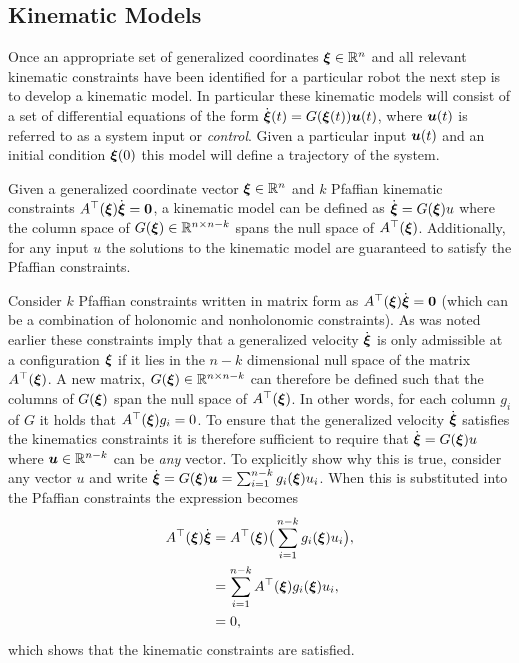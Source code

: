 \subsection{Kinematic Models}
Once an appropriate set of generalized coordinates $\bm{\xi} \in \mathbb{R}^n$ and all relevant kinematic constraints have been identified for a particular robot the next step is to develop a kinematic model.
In particular these kinematic models will consist of a set of differential equations of the form $\dot{\bm{\xi}}(t) = G(\bm{\xi}(t))\bm{u}(t)$, where $\bm{u}(t)$ is referred to as a system input or \textit{control}. Given a particular input $\bm{u}(t)$ and an initial condition $\bm{\xi}(0)$ this model will define a trajectory of the system.

\begin{definition} 
Given a generalized coordinate vector $\bm{\xi} \in \mathbb{R}^n$ and $k$ Pfaffian kinematic constraints $A^\top (\bm{\xi})\dot{\bm{\xi}}=\bm{0}$, a kinematic model can be defined as $\dot{\bm{\xi}} = G(\bm{\xi})u$ where the column space of $G(\bm{\xi}) \in \mathbb{R}^{n \times n-k}$ spans the null space of $A^\top (\bm{\xi})$. Additionally, for any input $u$ the solutions to the kinematic model are guaranteed to satisfy the Pfaffian constraints.
\end{definition}

Consider $k$ Pfaffian constraints written in matrix form as $A^\top (\bm{\xi})\dot{\bm{\xi}}=\bm{0}$ (which can be a combination of holonomic and nonholonomic constraints). As was noted earlier these constraints imply that a generalized velocity $\dot{\bm{\xi}}$ is only admissible at a configuration $\bm{\xi}$ if it lies in the $n-k$ dimensional null space of the matrix $A^\top (\bm{\xi})$. A new matrix, $G(\bm{\xi}) \in \mathbb{R}^{n \times n-k}$ can therefore be defined such that the columns of $G(\bm{\xi})$ span the null space of $A^\top (\bm{\xi})$. In other words, for each column $g_i$ of $G$ it holds that $A^\top (\bm{\xi})g_i = 0$. To ensure that the generalized velocity $\dot{\bm{\xi}}$ satisfies the kinematics constraints it is therefore sufficient to require that $\dot{\bm{\xi}} = G(\bm{\xi}) u$ where $\bm{u} \in \mathbb{R}^{n-k}$ can be \textit{any} vector. To explicitly show why this is true, consider any vector $u$ and write $\dot{\bm{\xi}} = G(\bm{\xi})\bm{u} = \sum_{i=1}^{n-k} g_i(\bm{\xi}) u_i$. When this is substituted into the Pfaffian constraints the expression becomes
\begin{equation*}
\begin{split}
A^\top (\bm{\xi})\dot{\bm{\xi}} &= A^\top (\bm{\xi})\big(\sum_{i=1}^{n-k} g_i(\bm{\xi}) u_i\big), \\
&= \sum_{i=1}^{n-k} A^\top (\bm{\xi}) g_i(\bm{\xi}) u_i, \\
&= 0, \\
\end{split}
\end{equation*}
which shows that the kinematic constraints are satisfied.

